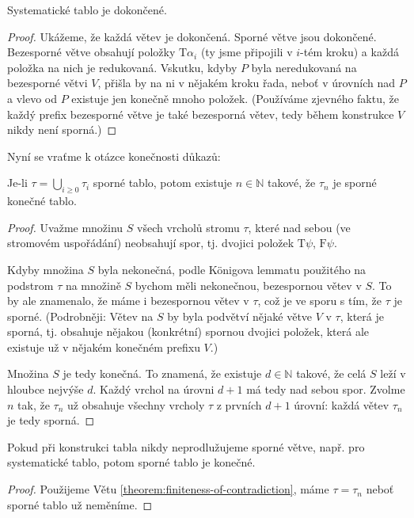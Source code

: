 \begin{lemma}\label{lemma:systematic-is-finished}
    Systematické tablo je dokončené.
\end{lemma}
\begin{proof}
    Ukážeme, že každá větev je dokončená. Sporné větve jsou dokončené. Bezesporné větve obsahují položky $\mathrm{T}\alpha_i$ (ty jsme připojili v $i$-tém kroku) a každá položka na nich je redukovaná. Vskutku, kdyby $P$ byla neredukovaná na bezesporné větvi $V$, přišla by na ni v nějakém kroku řada, neboť v úrovních nad $P$ a vlevo od $P$ existuje jen konečně mnoho položek. (Používáme zjevného faktu, že každý prefix bezesporné větve je také bezesporná větev, tedy během konstrukce $V$ nikdy není sporná.)
\end{proof}

Nyní se vraťme k otázce konečnosti důkazů:

\begin{theorem}\label{theorem:finiteness-of-contradiction}
    Je-li $\tau=\bigcup_{i\geq 0}\tau_i$ sporné tablo, potom existuje $n\in\mathbb N$ takové, že $\tau_n$ je sporné konečné tablo.
\end{theorem}
\begin{proof}
    Uvažme množinu $S$ všech vrcholů stromu $\tau$, které nad sebou (ve stromovém uspořádání) neobsahují spor, tj. dvojici položek $\mathrm{T}\psi$, $\mathrm{F}\psi$.

    Kdyby množina $S$ byla nekonečná, podle Königova lemmatu použitého na podstrom $\tau$ na množině $S$ bychom měli nekonečnou, bezespornou větev v $S$. To by ale znamenalo, že máme i bezespornou větev v $\tau$, což je ve sporu s tím, že $\tau$ je sporné. (Podrobněji: Větev na $S$ by byla podvětví nějaké větve $V$ v $\tau$, která je sporná, tj. obsahuje nějakou (konkrétní) spornou dvojici položek, která ale existuje už v nějakém konečném prefixu $V$.)

    Množina $S$ je tedy konečná. To znamená, že existuje $d\in\mathbb N$ takové, že celá $S$ leží v hloubce nejvýše $d$. Každý vrchol na úrovni $d+1$ má tedy nad sebou spor. Zvolme $n$ tak, že $\tau_n$ už obsahuje všechny vrcholy $\tau$ z prvních $d+1$ úrovní: každá větev $\tau_n$ je tedy sporná.
\end{proof}

\begin{corollary}\label{corollary:systematic-contradictory-is-finite}
    Pokud při konstrukci tabla nikdy neprodlužujeme sporné větve, např. pro systematické tablo, potom sporné tablo je konečné.
\end{corollary}
\begin{proof}
Použijeme Větu \ref{theorem:finiteness-of-contradiction}, máme $\tau=\tau_n$ neboť sporné tablo už neměníme.
\end{proof}

